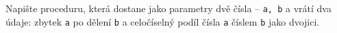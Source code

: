 \question[30]
Napište proceduru, která dostane jako parametry dvě čísla -- \texttt{a, b} a
vrátí dva údaje: zbytek \texttt{a} po dělení \texttt{b} a celočíselný podíl
čísla \texttt{a} číslem \texttt{b} jako dvojici.